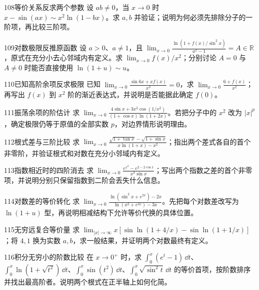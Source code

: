 \begin{exercise}{108}{等价关系反求两个参数}
设 $ab\ne0$，当 $x\to0$ 时 $x-\sin(ax)\sim x^2\ln(1-bx)$。求 $a,b$ 并验证；说明为何必须先排除分子的一阶项，再比较三阶项。
\end{exercise}
\begin{exercise}{109}{对数极限反推原函数}
设 $a>0$、$a\ne1$，且 $\lim_{x\to0}\frac{\ln(1+f(x)/\sin^2x)}{a^2-1}=A\in\mathbb R$，原式在充分小去心邻域内有定义。求 $\lim_{x\to0}f(x)/x^2$；分别讨论 $A=0$ 与 $A\ne0$ 时能否直接使用 $\ln(1+u)\sim u$。
\end{exercise}
\begin{exercise}{110}{已知高阶余项反求极限}
已知 $\lim_{x\to0}\frac{\sin6x+xf(x)}{x^3}=0$，求 $\lim_{x\to0}\frac{6+f(x)}{x^2}$；再写出 $f(x)$ 到 $x^2$ 阶的渐近表达式，并说明是否能据此确定 $f(0)$。
\end{exercise}
\begin{exercise}{111}{振荡余项的阶估计}
求 $\lim_{x\to0}\frac{4\sin x+3x^2\cos(1/x^2)}{(1+\cos x)\ln(1+2x)}$。若把分子中的 $x^2$ 改为 $|x|^p$，确定极限仍等于原值的全部实数 $p$，对边界情形说明理由。
\end{exercise}
\begin{exercise}{112}{根式差与三阶比较}
求 $\lim_{x\to0}\frac{\sqrt{1+\tan x}-\sqrt{1+\sin x}}{x\ln(1+x)-x^2}$；指出两个差式各自的首个非零阶，并验证根式和对数在充分小邻域内有定义。
\end{exercise}
\begin{exercise}{113}{指数相近时的四阶消去}
求 $\lim_{x\to0}\frac{e^{x^2}-e^{2-2\cos x}}{x^3\sin x}$；写出两个指数之差的首个非零项，并说明分别只保留指数到二阶会丢失什么信息。
\end{exercise}
\begin{exercise}{114}{对数差的等价转化}
求 $\lim_{x\to0}\frac{\ln(\sin^2x+e^{2x})-2x}{\ln(x^2+e^{3x})-3x}$。先把每个对数差改写为 $\ln(1+u)$ 型，再说明相减结构下允许等价代换的具体位置。
\end{exercise}
\begin{exercise}{115}{无穷远复合等价量}
求 $\lim_{|x|\to\infty}x\left[\sin\ln(1+4/x)-\sin\ln(1+1/x)\right]$；将 $4,1$ 换为实数 $a,b$，求一般结果，并证明两个对数最终有定义。
\end{exercise}
\begin{exercise}{116}{积分无穷小的阶数比较}
在 $x\to0^+$ 时，求 $\int_0^x(e^t-1)\,\dd t$、$\int_0^x\ln(1+\sqrt{t^2})\,\dd t$、$\int_0^x\sin(t^2)\,\dd t$、$\int_0^x\sqrt{\sin^2t}\,\dd t$ 的等价首项，按阶数排序并找出最高阶者。说明两个根式在正半轴上如何化简。
\end{exercise}
